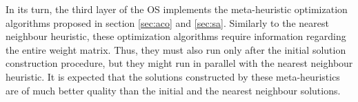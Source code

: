 In its turn, the third layer of the OS implements the meta-heuristic optimization algorithms proposed in section \ref{sec:aco} and \ref{sec:sa}. Similarly to the nearest neighbour heuristic, these optimization algorithms require information regarding the entire weight matrix. Thus, they must also run only after the initial solution construction procedure, but they might run in parallel with the nearest neighbour heuristic. It is expected that the solutions constructed by these meta-heuristics are of much better quality than the initial and the nearest neighbour solutions.



